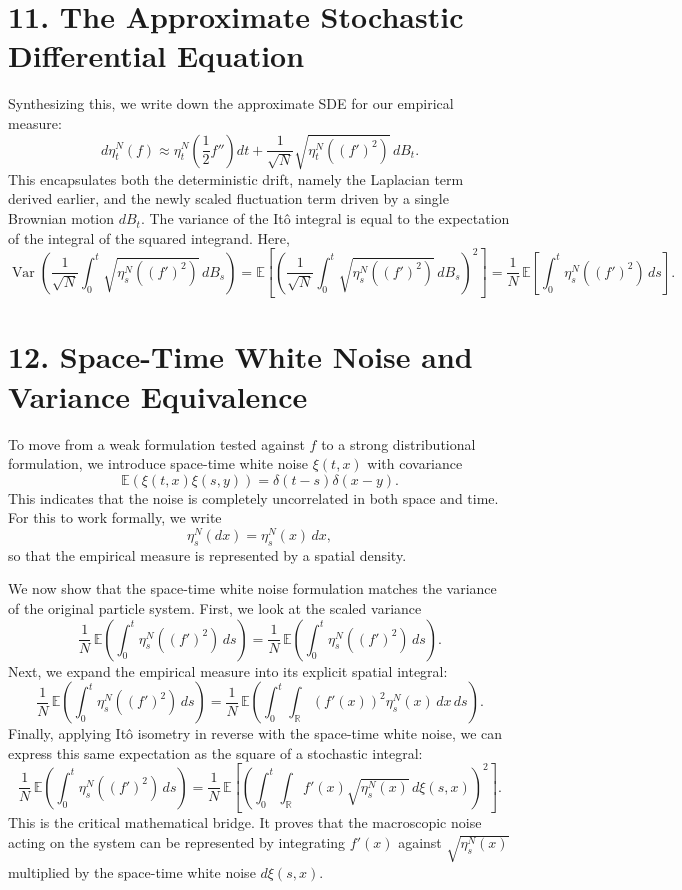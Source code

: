 \documentclass[11pt]{article}
\theoremstyle{definition}
\theoremstyle{remark}
\begin{document}
\section*{11. The Approximate Stochastic Differential Equation}
Synthesizing this, we write down the approximate SDE for our empirical measure:
\[
d\eta_t^N(f)\approx \eta_t^N\!\left(\frac{1}{2}f''\right)dt+\frac{1}{\sqrt{N}}\sqrt{\eta_t^N((f')^2)}\,dB_t.
\]
This encapsulates both the deterministic drift, namely the Laplacian term derived earlier, and the newly scaled fluctuation term driven by a single Brownian motion $dB_t$. The variance of the It\^o integral is equal to the expectation of the integral of the squared integrand. Here,
\[
\operatorname{Var}\!\left(\frac{1}{\sqrt{N}}\int_0^t \sqrt{\eta_s^N((f')^2)}\,dB_s\right)
=
\mathbb E\!\left[\left(\frac{1}{\sqrt{N}}\int_0^t \sqrt{\eta_s^N((f')^2)}\,dB_s\right)^2\right]
=
\frac{1}{N}\,\mathbb E\!\left[\int_0^t \eta_s^N((f')^2)\,ds\right].
\]

\section*{12. Space-Time White Noise and Variance Equivalence}
To move from a weak formulation tested against $f$ to a strong distributional formulation, we introduce space-time white noise $\xi(t,x)$ with covariance
\[
\mathbb E(\xi(t,x)\xi(s,y))=\delta(t-s)\delta(x-y).
\]
This indicates that the noise is completely uncorrelated in both space and time. For this to work formally, we write
\[
\eta_s^N(dx)=\eta_s^N(x)\,dx,
\]
so that the empirical measure is represented by a spatial density.

We now show that the space-time white noise formulation matches the variance of the original particle system. First, we look at the scaled variance
\[
\frac{1}{N}\,\mathbb E\!\left(\int_0^t \eta_s^N((f')^2)\,ds\right)
=
\frac{1}{N}\,\mathbb E\!\left(\int_0^t \eta_s^N((f')^2)\,ds\right).
\]
Next, we expand the empirical measure into its explicit spatial integral:
\[
\frac{1}{N}\,\mathbb E\!\left(\int_0^t \eta_s^N((f')^2)\,ds\right)
=
\frac{1}{N}\,\mathbb E\!\left(\int_0^t \int_{\mathbb R} (f'(x))^2\eta_s^N(x)\,dx\,ds\right).
\]
Finally, applying It\^o isometry in reverse with the space-time white noise, we can express this same expectation as the square of a stochastic integral:
\[
\frac{1}{N}\,\mathbb E\!\left(\int_0^t \eta_s^N((f')^2)\,ds\right)
=
\frac{1}{N}\,\mathbb E\!\left[\left(\int_0^t \int_{\mathbb R} f'(x)\sqrt{\eta_s^N(x)}\,d\xi(s,x)\right)^2\right].
\]
This is the critical mathematical bridge. It proves that the macroscopic noise acting on the system can be represented by integrating $f'(x)$ against $\sqrt{\eta_s^N(x)}$ multiplied by the space-time white noise $d\xi(s,x)$.
\end{document}
